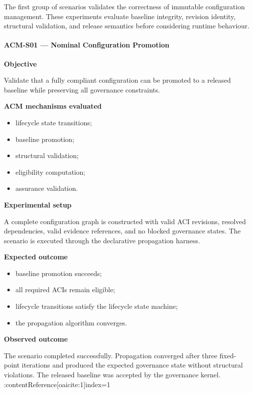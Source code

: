 \documentclass[10pt]{article}
\begin{document}
The first group of scenarios validates the correctness of immutable
configuration management. These experiments evaluate baseline integrity,
revision identity, structural validation, and release semantics before
considering runtime behaviour.

\paragraph{ACM-S01 --- Nominal Configuration Promotion}

\textbf{Objective}

Validate that a fully compliant configuration can be promoted to a released
baseline while preserving all governance constraints.

\textbf{ACM mechanisms evaluated}

\begin{itemize}
\item lifecycle state transitions;
\item baseline promotion;
\item structural validation;
\item eligibility computation;
\item assurance validation.
\end{itemize}

\textbf{Experimental setup}

A complete configuration graph is constructed with valid ACI revisions,
resolved dependencies, valid evidence references, and no blocked governance
states. The scenario is executed through the declarative propagation harness.

\textbf{Expected outcome}

\begin{itemize}
\item baseline promotion succeeds;
\item all required ACIs remain eligible;
\item lifecycle transitions satisfy the lifecycle state machine;
\item the propagation algorithm converges.
\end{itemize}

\textbf{Observed outcome}

The scenario completed successfully.
Propagation converged after three fixed-point iterations and produced the
expected governance state without structural violations. The released baseline
was accepted by the governance kernel. :contentReference[oaicite:1]{index=1}
\end{document}
